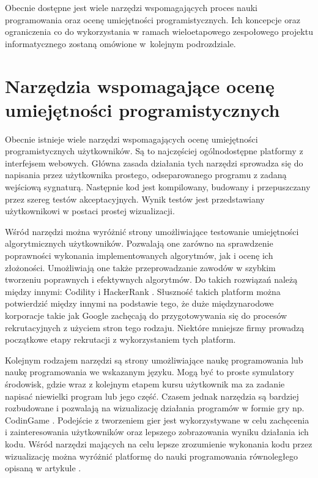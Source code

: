 Obecnie dostępne jest wiele narzędzi wspomagających proces nauki programowania oraz ocenę umiejętności programistycznych.
Ich koncepcje oraz ograniczenia co do wykorzystania w ramach wieloetapowego zespołowego projektu informatycznego zostaną omówione w~kolejnym podrozdziale.

\vfill

\section{Narzędzia wspomagające ocenę umiejętności programistycznych}
\label{tools}

Obecnie istnieje wiele narzędzi wspomagających ocenę umiejętności programistycznych użytkowników.
Są to najczęściej ogólnodostępne platformy z interfejsem webowych.
Główna zasada działania tych narzędzi sprowadza się do napisania przez użytkownika prostego, odseparowanego programu z zadaną wejściową sygnaturą.
Następnie kod jest kompilowany, budowany i przepuszczany przez szereg testów akceptacyjnych.
Wynik testów jest przedstawiany użytkownikowi w postaci prostej wizualizacji.

Wśród narzędzi można wyróżnić strony umożliwiające testowanie umiejętności algorytmicznych użytkowników.
Pozwalają one zarówno na sprawdzenie poprawności wykonania implementowanych algorytmów, jak i ocenę ich złożoności.
Umożliwiają one także przeprowadzanie zawodów w szybkim tworzeniu poprawnych i efektywnych algorytmów.
Do takich rozwiązań należą między innymi: Codility \cite{codility} i HackerRank \cite{hacker-rank}.
Słuszność takich platform można potwierdzić między innymi na podstawie tego, że duże międzynarodowe korporacje takie jak Google zachęcają do przygotowywania się do procesów rekrutacyjnych z użyciem stron tego rodzaju.
Niektóre mniejsze firmy prowadzą początkowe etapy rekrutacji z wykorzystaniem tych platform.

Kolejnym rodzajem narzędzi są strony umożliwiające naukę programowania lub naukę programowania we wskazanym języku.
Mogą być to proste symulatory środowisk, gdzie wraz z kolejnym etapem kursu użytkownik ma za zadanie napisać niewielki program lub jego część.
Czasem jednak narzędzia są bardziej rozbudowane i pozwalają na wizualizację działania programów w formie gry np. CodinGame \cite{game-coder}.
Podejście z tworzeniem gier jest wykorzystywane w celu zachęcenia i zainteresowania użytkowników oraz lepszego zobrazowania wyniku działania ich kodu.
Wśród narzędzi mających na celu lepsze zrozumienie wykonania kodu przez wizualizację można wyróżnić platformę do nauki programowania równoległego opisaną w artykule \cite{pharaller-platform}.


